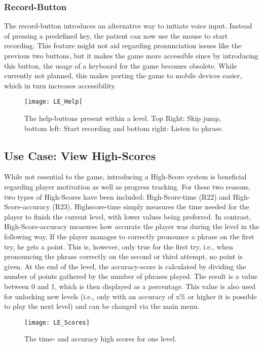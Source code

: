 \documentclass[draft,final]{vutinfth} %
\begin{document}
\subsubsection{Record-Button}
The record-button introduces an alternative way to initiate voice input. Instead of pressing a predefined key, the patient can now use the mouse to start recording. This feature might not aid regarding pronunciation issues like the previous two buttons, but it makes the game more accessible since by introducing this button, the usage of a keyboard for the game becomes obsolete. While currently not planned, this makes porting the game to mobile devices easier, which in turn increases accessibility.


\begin{figure}
\begin{center}
\texttt{[image: LE\_Help]}
\end{center}
\caption{The help-buttons present within a level. Top Right: Skip jump, bottom left: Start recording and bottom right: Listen to phrase.}
\end{figure}
\subsection{Use Case: View High-Scores}
While not essential to the game, introducing a High-Score system is beneficial regarding player motivation as well as progress tracking. For these two reasons, two types of High-Scores have been included: High-Score-time (R22) and High-Score-accuracy (R23). Highscore-time simply measures the time needed for the player to finish the current level, with lower values being preferred. In contrast, High-Score-accuracy measures how accurate the player was during the level in the following way. If the player manages to correctly pronounce a phrase on the first try, he gets a point. This is, however, only true for the first try, i.e., when pronouncing the phrase correctly on the second or third attempt, no point is given. At the end of the level, the accuracy-score is calculated by dividing the number of points gathered by the number of phrases played. The result is a value between 0 and 1, which is then displayed as a percentage. This value is also used for unlocking new levels (i.e., only with an accuracy of x\% or higher it is possible to play the next level) and can be changed via the main menu.

\begin{figure}
\begin{center}
\texttt{[image: LE\_Scores]}
\end{center}
\caption{The time- and accuracy high scores for one level.}
\end{figure}
\end{document}

